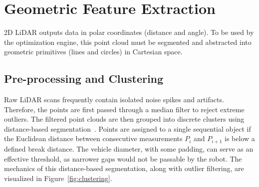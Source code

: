 \section{Geometric Feature Extraction}
\label{sec:geometric-feature-extraction}

2D LiDAR outputs data in polar coordinates (distance and angle). To be used by the optimization engine, this point cloud must be segmented and abstracted into geometric primitives (lines and circles) in Cartesian space.

\subsection{Pre-processing and Clustering}
\label{subsec:tb-preprocessing}

Raw LiDAR scans frequently contain isolated noise spikes and artifacts. Therefore, the points are first passed through a median filter to reject extreme outliers. The filtered point clouds are then grouped into discrete clusters using distance-based segmentation~\cite{nguyen2005lineextraction}. Points are assigned to a single sequential object if the Euclidean distance between consecutive measurements $P_i$ and $P_{i+1}$ is below a defined break distance. The vehicle diameter, with some padding, can serve as an effective threshold, as narrower gaps would not be passable by the robot. The mechanics of this distance-based segmentation, along with outlier filtering, are visualized in Figure~\ref{fig:clustering}.

